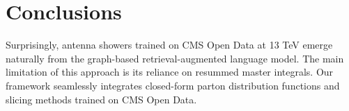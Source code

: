 \section{Conclusions}\label{sec:conclusions}

Surprisingly, antenna showers trained on CMS Open Data at 13 TeV emerge
naturally from the graph-based retrieval-augmented language model. The
main limitation of this approach is its reliance on resummed master
integrals. Our framework seamlessly integrates closed-form parton
distribution functions and slicing methods trained on CMS Open Data.

